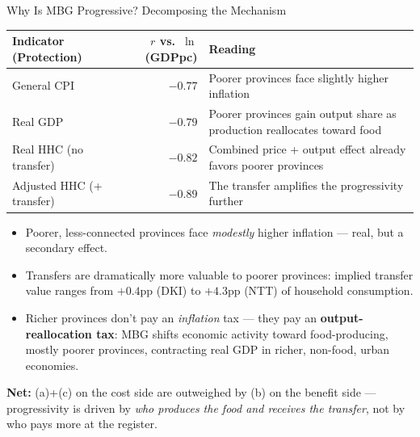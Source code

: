 \documentclass[11pt,aspectratio=169]{beamer}
\begin{document}
\begin{frame}{Why Is MBG Progressive? Decomposing the Mechanism}
\footnotesize
\centering
\begin{tabular}{l r p{5.6cm}}
	\toprule
	\textbf{Indicator (Protection)} & \textbf{$r$ vs.\ $\ln$(GDPpc)} & \textbf{Reading} \\
	\midrule
	General CPI                    & $-0.77$ & Poorer provinces face slightly higher inflation \\
	Real GDP                       & $-0.79$ & Poorer provinces gain output share as production reallocates toward food \\
	Real HHC (no transfer)         & $-0.82$ & Combined price + output effect already favors poorer provinces \\
	Adjusted HHC (+ transfer)      & $-0.89$ & The transfer amplifies the progressivity further \\
	\bottomrule
\end{tabular}

\smallskip
\begin{itemize}\setlength\itemsep{3pt}
	\item[(a)] Poorer, less-connected provinces face \emph{modestly} higher inflation --- real, but a secondary effect.
	\item[(b)] Transfers are dramatically more valuable to poorer provinces: implied transfer value ranges from $+0.4$pp (DKI) to $+4.3$pp (NTT) of household consumption.
	\item[(c)] Richer provinces don't pay an \emph{inflation} tax --- they pay an \textbf{output-reallocation tax}: MBG shifts economic activity toward food-producing, mostly poorer provinces, contracting real GDP in richer, non-food, urban economies.
\end{itemize}

{\scriptsize\textcolor{lubrown}{\textbf{Net:}} (a)+(c) on the cost side are outweighed by (b) on the benefit side --- progressivity is driven by \emph{who produces the food and receives the transfer}, not by who pays more at the register.}
\end{frame}
\end{document}
